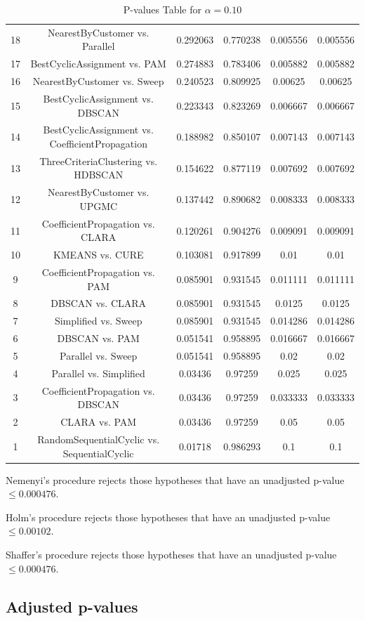 \documentclass[a4paper,10pt]{article}
\begin{document}
\begin{landscape}
\begin{table}[!htp]
\begin{tabular}{cccccc}
18&NearestByCustomer vs. Parallel&0.292063&0.770238&0.005556&0.005556\\
17&BestCyclicAssignment vs. PAM&0.274883&0.783406&0.005882&0.005882\\
16&NearestByCustomer vs. Sweep&0.240523&0.809925&0.00625&0.00625\\
15&BestCyclicAssignment vs. DBSCAN&0.223343&0.823269&0.006667&0.006667\\
14&BestCyclicAssignment vs. CoefficientPropagation&0.188982&0.850107&0.007143&0.007143\\
13&ThreeCriteriaClustering vs. HDBSCAN&0.154622&0.877119&0.007692&0.007692\\
12&NearestByCustomer vs. UPGMC&0.137442&0.890682&0.008333&0.008333\\
11&CoefficientPropagation vs. CLARA&0.120261&0.904276&0.009091&0.009091\\
10&KMEANS vs. CURE&0.103081&0.917899&0.01&0.01\\
9&CoefficientPropagation vs. PAM&0.085901&0.931545&0.011111&0.011111\\
8&DBSCAN vs. CLARA&0.085901&0.931545&0.0125&0.0125\\
7&Simplified vs. Sweep&0.085901&0.931545&0.014286&0.014286\\
6&DBSCAN vs. PAM&0.051541&0.958895&0.016667&0.016667\\
5&Parallel vs. Sweep&0.051541&0.958895&0.02&0.02\\
4&Parallel vs. Simplified&0.03436&0.97259&0.025&0.025\\
3&CoefficientPropagation vs. DBSCAN&0.03436&0.97259&0.033333&0.033333\\
2&CLARA vs. PAM&0.03436&0.97259&0.05&0.05\\
1&RandomSequentialCyclic vs. SequentialCyclic&0.01718&0.986293&0.1&0.1\\
\hline
\end{tabular}
\caption{P-values Table for $\alpha=0.10$}
\end{table}Nemenyi's procedure rejects those hypotheses that have an unadjusted p-value $\le0.000476$.

Holm's procedure rejects those hypotheses that have an unadjusted p-value $\le0.00102$.

Shaffer's procedure rejects those hypotheses that have an unadjusted p-value $\le0.000476$.

\pagebreak

\subsection{Adjusted p-values}


\end{landscape}
\end{document}
